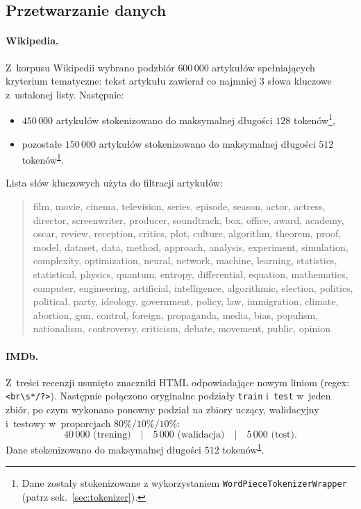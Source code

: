 \documentclass[a4paper,11pt,twoside]{report}
\theoremstyle{definition}
\begin{document}
\subsection{Przetwarzanie danych}\label{sec:data_processing}

\paragraph{Wikipedia.}
Z~korpusu Wikipedii wybrano podzbiór $600\,000$ artykułów spełniających kryterium tematyczne:
tekst artykułu zawierał co najmniej $3$ słowa kluczowe z~ustalonej listy.
Następnie:
\begin{itemize}
  \item $450\,000$ artykułów stokenizowano do maksymalnej długości $128$ tokenów\footnote{Dane zostały stokenizowane z wykorzystaniem \texttt{WordPieceTokenizerWrapper} (patrz sek.~\ref{sec:tokenizer}).\label{fn:data-tokenizer}},
  \item pozostałe $150\,000$ artykułów stokenizowano do maksymalnej długości $512$ tokenów\textsuperscript{\ref{fn:data-tokenizer}}.
\end{itemize}
Lista słów kluczowych użyta do filtracji artykułów:
\begin{quote}\small\ttfamily
film, movie, cinema, television, series, episode, season, actor, actress, director, screenwriter, producer, soundtrack, box, office,
award, academy, oscar, review, reception, critics, plot, culture, algorithm, theorem, proof, model, dataset, data, method, approach,
analysis, experiment, simulation, complexity, optimization, neural, network, machine, learning, statistics, statistical, physics, quantum,
entropy, differential, equation, mathematics, computer, engineering, artificial, intelligence, algorithmic, election, politics, political,
party, ideology, government, policy, law, immigration, climate, abortion, gun, control, foreign, propaganda, media, bias, populism,
nationalism, controversy, criticism, debate, movement, public, opinion
\end{quote}

\paragraph{IMDb.}
Z~treści recenzji usunięto znaczniki HTML odpowiadające nowym liniom (regex: \verb|<br\s*/?>|).
Następnie połączono oryginalne podziały \texttt{train} i~\texttt{test} w~jeden zbiór,
po czym wykonano ponowny podział na zbiory uczący, walidacyjny i~testowy
w~proporcjach $80\%/10\%/10\%$:
\[
40\,000 \text{ (trening)} \quad|\quad 5\,000 \text{ (walidacja)} \quad|\quad 5\,000 \text{ (test)}.
\]
Dane stokenizowano do maksymalnej długości $512$ tokenów\textsuperscript{\ref{fn:data-tokenizer}}.
\end{document}
